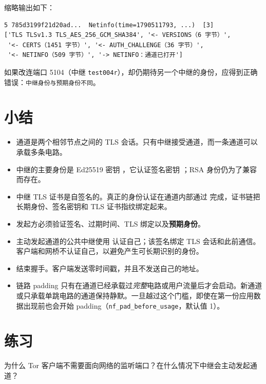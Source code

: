 缩略输出如下：

\begin{lstlisting}[numbers=none]
5 785d3199f21d20ad...  Netinfo(time=1790511793, ...)  [3]
['TLS TLSv1.3 TLS_AES_256_GCM_SHA384', '<- VERSIONS（6 字节）',
 '<- CERTS（1451 字节）', '<- AUTH_CHALLENGE（36 字节）',
 '<- NETINFO（509 字节）', '-> NETINFO：通道已打开']
\end{lstlisting}

如果改连端口 5104（中继 \texttt{test004r}），却仍期待另一个中继的身份，应得到正确错误：\texttt{中继身份与预期身份不同}。

\section*{小结}
\begin{itemize}
  \item 通道是两个相邻节点之间的 TLS 会话。只有中继接受通道，而一条通道可以承载多条电路。
  \item 中继的主要身份是 Ed25519 密钥 ，它认证签名密钥 ；RSA 身份仍为了兼容而存在。
  \item 中继 TLS 证书是自签名的。真正的身份认证在通道内部通过  完成，证书链把长期身份、签名密钥和 TLS 证书指纹绑定起来。
  \item 发起方必须验证签名、过期时间、TLS 绑定以及\textbf{预期身份}。
  \item 主动发起通道的公共中继使用  认证自己；该签名绑定 TLS 会话和此前通信。客户端和网桥不认证自己，以避免产生可长期识别的身份。
  \item {} 结束握手。客户端发送零时间戳，并且不发送自己的地址。
  \item 链路 padding 只有在通道已经承载过\emph{完整}电路或用户流量后才会启动。新通道或只承载单跳电路的通道保持静默。一旦越过这个门槛，即使在第一份应用数据出现前也会开始 padding（\texttt{nf\_pad\_before\_usage}，默认值 1）。
\end{itemize}

\section*{练习}

\begin{esercizio}[1]\label{es:07-ruoli}
为什么 Tor 客户端不需要面向网络的监听端口？在什么情况下中继会主动发起通道？
\end{esercizio}

